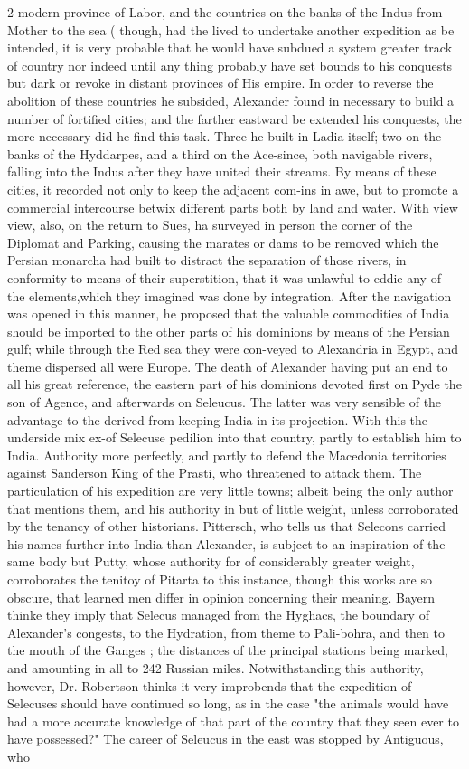 \documentclass[10pt]{article}
\begin{document}
\begin{multicols}{2}
modern province of Labor, and the countries on the banks of the Indus from Mother to the sea ( though, had the lived to undertake another expedition as be intended, it is very probable that he would have subdued a system greater track of country nor indeed until any thing probably have set bounds to his conquests but dark or revoke in distant provinces of His empire. In order to reverse the abolition of these countries he subsided, Alexander found in necessary to build a number of fortified cities; and the farther eastward be extended his conquests, the more necessary did he find this task. Three he built in Ladia itself; two on the banks of the Hyddarpes, and a third on the Ace-since, both navigable rivers, falling into the Indus after they have united their streams. By means of these cities, it recorded not only to keep the adjacent com-ins in awe, but to promote a commercial intercourse betwix different parts both by land and water. With view view, also, on the return to Sues, ha surveyed in person the corner of the Diplomat and Parking, causing the marates or dams to be removed which the Persian monarcha had built to distract the separation of those rivers, in conformity to means of their superstition, that it was unlawful to eddie any of the elements,which they imagined was done by integration. After the navigation was opened in this manner, he proposed that the valuable commodities of India should be imported to the other parts of his dominions by means of the Persian gulf; while through the Red sea they were con-veyed to Alexandria in Egypt, and theme dispersed all were Europe. The death of Alexander having put an end to all his great reference, the eastern part of his dominions devoted first on Pyde the son of Agence, and afterwards on Seleucus. The latter was very sensible of the advantage to the derived from keeping India in its projection. With this the underside mix ex-of Selecuse pedilion into that country, partly to establish him to India. Authority more perfectly, and partly to defend the Macedonia territories against Sanderson King of the Prasti, who threatened to attack them. The particulation of his expedition are very little towns; albeit being the only author that mentions them, and his authority in but of little weight, unless corroborated by the tenancy of other historians. Pittersch, who tells us that Selecons carried his names further into India than Alexander, is subject to an inspiration of the same body but Putty, whose authority for of considerably greater weight, corroborates the tenitoy of Pitarta to this instance, though this works are so obscure, that learned men differ in opinion concerning their meaning. Bayern thinke they imply that Selecus managed from the Hyghacs, the boundary of Alexander’s congests, to the Hydration, from theme to Pali-bohra, and then to the mouth of the Ganges ; the distances of the principal stations being marked, and amounting in all to 242 Russian miles. Notwithstanding this authority, however, Dr. Robertson thinks it very improbends that the expedition of Selecuses should have continued so long, as in the case "the animals would have had a more accurate knowledge of that part of the country that they seen ever to have possessed?" The career of Seleucus in the east was stopped by Antiguous, who 
\end{multicols}
\end{document}
